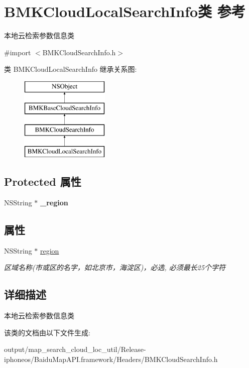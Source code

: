 \hypertarget{interface_b_m_k_cloud_local_search_info}{}\section{B\+M\+K\+Cloud\+Local\+Search\+Info类 参考}
\label{interface_b_m_k_cloud_local_search_info}


本地云检索参数信息类  




{\ttfamily \#import $<$B\+M\+K\+Cloud\+Search\+Info.\+h$>$}

类 B\+M\+K\+Cloud\+Local\+Search\+Info 继承关系图\+:\begin{figure}[H]
\begin{center}
\leavevmode
\includegraphics[height=4.000000cm]{interface_b_m_k_cloud_local_search_info}
\end{center}
\end{figure}
\subsection*{Protected 属性}
\begin{DoxyCompactItemize}
\item 
\hypertarget{interface_b_m_k_cloud_local_search_info_a222e06088269c5b3e67d3f9a416d7eff}{}N\+S\+String $\ast$ {\bfseries \+\_\+region}\label{interface_b_m_k_cloud_local_search_info_a222e06088269c5b3e67d3f9a416d7eff}

\end{DoxyCompactItemize}
\subsection*{属性}
\begin{DoxyCompactItemize}
\item 
\hypertarget{interface_b_m_k_cloud_local_search_info_a0f5a080b5eed8356479c5b3f3e483e29}{}N\+S\+String $\ast$ \hyperlink{interface_b_m_k_cloud_local_search_info_a0f5a080b5eed8356479c5b3f3e483e29}{region}\label{interface_b_m_k_cloud_local_search_info_a0f5a080b5eed8356479c5b3f3e483e29}

\begin{DoxyCompactList}\small\item\em 区域名称(市或区的名字，如北京市，海淀区)，必选, 必须最长25个字符 \end{DoxyCompactList}\end{DoxyCompactItemize}


\subsection{详细描述}
本地云检索参数信息类 

该类的文档由以下文件生成\+:\begin{DoxyCompactItemize}
\item 
output/map\+\_\+search\+\_\+cloud\+\_\+loc\+\_\+util/\+Release-\/iphoneos/\+Baidu\+Map\+A\+P\+I.\+framework/\+Headers/B\+M\+K\+Cloud\+Search\+Info.\+h\end{DoxyCompactItemize}
